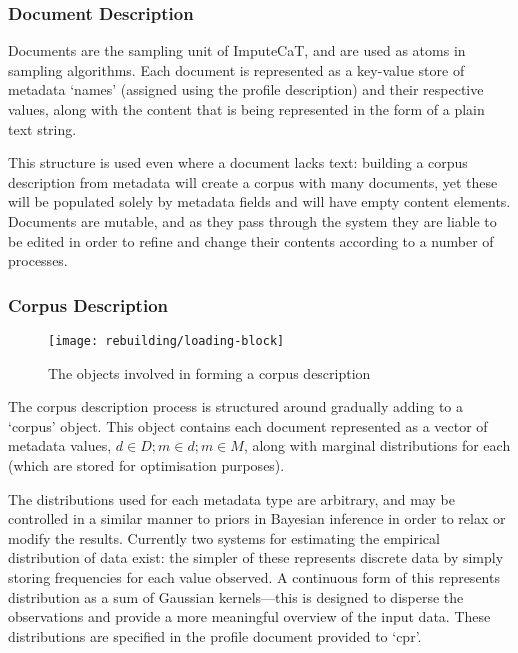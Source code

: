 \subsubsection{Document Description}
Documents are the sampling unit of ImputeCaT, and are used as atoms in sampling algorithms.  Each document is represented as a key-value store of metadata `names' (assigned using the profile description) and their respective values, along with the content that is being represented in the form of a plain text string.

This structure is used even where a document lacks text: building a corpus description from metadata will create a corpus with many documents, yet these will be populated solely by metadata fields and will have empty content elements.  Documents are mutable, and as they pass through the system they are liable to be edited in order to refine and change their contents according to a number of processes.




\subsubsection{Corpus Description}


\begin{figure}[h]
    \centering
    \texttt{[image: rebuilding/loading-block]}
    \caption{The objects involved in forming a corpus description}
    \label{fig:rebuilding:loading-block}
\end{figure}


The corpus description process is structured around gradually adding to a `corpus' object.  This object contains each document represented as a vector of metadata values, $d \in D; m \in d; m \in M$, along with marginal distributions for each (which are stored for optimisation purposes).


The distributions used for each metadata type are arbitrary, and may be controlled in a similar manner to priors in Bayesian inference in order to relax or modify the results.  Currently two systems for estimating the empirical distribution of data exist: the simpler of these represents discrete data by simply storing frequencies for each value observed.  A continuous form of this represents  distribution as a sum of Gaussian kernels---this is designed to disperse the observations and provide a more meaningful overview of the input data.  These distributions are specified in the profile document provided to `cpr'.

